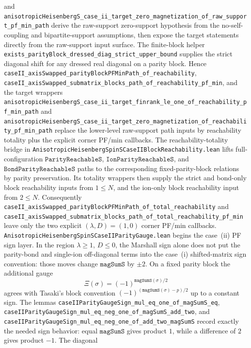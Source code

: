 \documentclass[a4paper,11pt]{article}
\begin{document}
and
\texttt{anisotropicHeisenbergS\_case\_ii\_target\_zero\_magnetization\_of\_raw\_support\_pf\_min\_path}
derive the raw-support zero-support hypothesis from the no-self-coupling and
bipartite-support assumptions, then expose the target statements directly from
the raw-support input surface.  The finite-block helper
\texttt{exists\_parityBlock\_dressed\_diag\_strict\_upper\_bound} supplies the
strict diagonal shift for any dressed real diagonal on a parity block.  Hence
\texttt{caseII\_axisSwapped\_parityBlockPFMinPath\_of\_reachability},
\texttt{caseII\_axisSwapped\_submatrix\_blocks\_path\_of\_reachability\_pf\_min},
and the target wrappers
\texttt{anisotropicHeisenbergS\_case\_ii\_target\_finrank\_le\_one\_of\_reachability\_pf\_min\_path}
and
\texttt{anisotropicHeisenbergS\_case\_ii\_target\_zero\_magnetization\_of\_reachability\_pf\_min\_path}
replace the lower-level raw-support path inputs by reachability totality plus
the explicit corner PF/min callbacks.  The reachability-totality bridge in
\texttt{AnisotropicHeisenbergSpinSCaseIIBlockReachability.lean} lifts
full-configuration \(\texttt{ParityReachableS}\),
\(\texttt{IonParityReachableS}\), and \(\texttt{BondParityReachableS}\) paths
to the corresponding fixed-parity-block relations by parity preservation.  Its
totality wrappers then supply the strict and bond-only block reachability
inputs from \(1\le N\), and the ion-only block reachability input from
\(2\le N\).  Consequently
\texttt{caseII\_axisSwapped\_parityBlockPFMinPath\_of\_total\_reachability}
and
\texttt{caseII\_axisSwapped\_submatrix\_blocks\_path\_of\_total\_reachability\_pf\_min}
leave only the two explicit \((\lambda,D)=(1,0)\) corner PF/min callbacks.
\texttt{AnisotropicHeisenbergSpinSCaseIIParityGauge.lean} begins the
case~(ii) PF sign layer.  In the region \(\lambda\ge1\), \(D\le0\), the
Marshall sign alone does not put the parity-bond and single-ion off-diagonal
terms into the case~(i) shifted-matrix sign convention: those moves change
\(\texttt{magSumS}\) by \(\pm2\).  On a fixed parity block the additional
gauge
\[
  \Xi(\sigma)=(-1)^{\texttt{magSumS}(\sigma)/2}
\]
agrees with Tasaki's block convention
\((-1)^{(\texttt{magSumS}(\sigma)-p)/2}\) up to a constant sign.  The lemmas
\texttt{caseIIParityGaugeSign\_mul\_eq\_one\_of\_magSumS\_eq},
\texttt{caseIIParityGaugeSign\_mul\_eq\_neg\_one\_of\_magSumS\_add\_two},
and
\texttt{caseIIParityGaugeSign\_mul\_eq\_neg\_one\_of\_add\_two\_magSumS}
record exactly the needed sign behavior: equal \(\texttt{magSumS}\) gives
product \(1\), while a difference of \(2\) gives product \(-1\).  The diagonal
\end{document}
